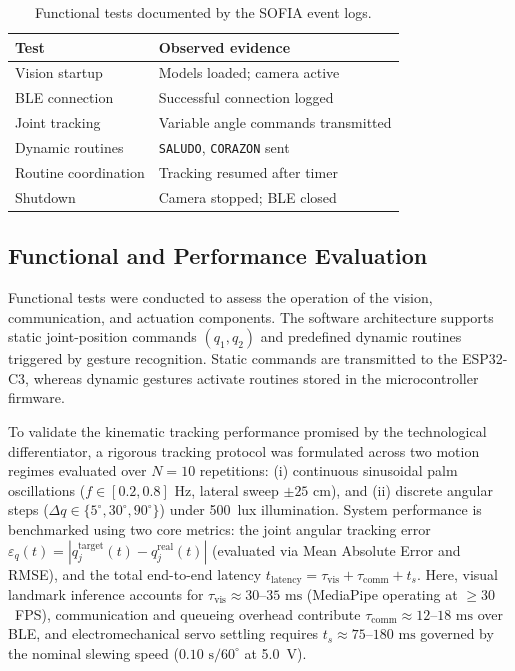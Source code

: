\documentclass[lettersize,journal]{IEEEtran}
\begin{document}
	\begin{table}[!t]
		\centering
		\caption{Functional tests documented by the SOFIA event logs.}
		\label{tab:sofia_log_validation}
		\footnotesize
		\begin{tabular}{ll}
			\hline
			\textbf{Test} & \textbf{Observed evidence} \\
			\hline
			Vision startup & Models loaded; camera active \\
			BLE connection & Successful connection logged \\
			Joint tracking & Variable angle commands transmitted \\
			Dynamic routines & \texttt{SALUDO}, \texttt{CORAZON} sent \\
			Routine coordination & Tracking resumed after timer \\
			Shutdown & Camera stopped; BLE closed \\
			\hline
		\end{tabular}
	\end{table}
	
	
	\subsection{Functional and Performance Evaluation}
	\label{sec:functional_performance}
	
	Functional tests were conducted to assess the operation of the
	vision, communication, and actuation components. The software
	architecture supports static joint-position commands $(q_1,q_2)$
	and predefined dynamic routines triggered by gesture recognition.
	Static commands are transmitted to the ESP32-C3, whereas dynamic
	gestures activate routines stored in the microcontroller firmware.
	
	To validate the kinematic tracking performance promised by the
	technological differentiator, a rigorous tracking protocol was
	formulated across two motion regimes evaluated over $N = 10$ repetitions:
	(i) continuous sinusoidal palm oscillations ($f \in [0.2, 0.8]\text{ Hz}$,
	lateral sweep $\pm 25\text{ cm}$), and (ii) discrete angular steps
	($\Delta q \in \{5^\circ, 30^\circ, 90^\circ\}$) under 500~lux illumination.
	System performance is benchmarked using two core metrics:
	the joint angular tracking error $\varepsilon_q(t) = |q_j^{\text{target}}(t) - q_j^{\text{real}}(t)|$
	(evaluated via Mean Absolute Error and RMSE), and the total end-to-end
	latency $t_{\text{latency}} = \tau_{\text{vis}} + \tau_{\text{comm}} + t_s$.
	Here, visual landmark inference accounts for $\tau_{\text{vis}} \approx 30\text{--}35\text{ ms}$
	(MediaPipe operating at $\ge 30$~FPS), communication and queueing overhead
	contribute $\tau_{\text{comm}} \approx 12\text{--}18\text{ ms}$ over BLE, and
	electromechanical servo settling requires $t_s \approx 75\text{--}180\text{ ms}$
	governed by the nominal slewing speed ($0.10\text{ s}/60^\circ$ at 5.0~V).
	
\end{document}
